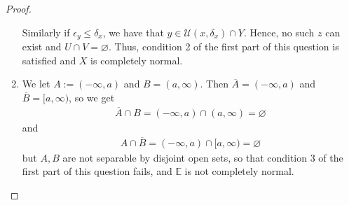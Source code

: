 \documentclass[12pt]{extarticle}
\newcommand{\<}{\langle}
\renewcommand{\>}{\rangle}
\renewcommand{\emptyset}{\varnothing}
\theoremstyle{definition}
\begin{document}
\begin{proof}
\begin{enumerate}
    Similarly if $ \epsilon_y \leq \delta_x$, we have that $y \in \mathcal{U}(x, \delta_x) \cap Y$. Hence, no such $z$ can exist and $U \cap V = \emptyset$. Thus, condition 2 of the first part of this question is satisfied and $X$ is completely normal.
  \item
    We let $A := (- \infty, a)$ and $B = (a, \infty)$. Then $\overline{A} = (- \infty, a) $ and $\overline{B} = [a, \infty)$, so we get 
    \begin{align*}
      \overline{A} \cap B = (- \infty, a) \cap (a, \infty) = \emptyset
    \end{align*}
    and 
    \begin{align*}
      A \cap \overline{B} = (- \infty, a) \cap [a, \infty) = \emptyset
    \end{align*}
    but $A, B$ are not separable by disjoint open sets, so that condition 3 of the first part of this question fails, and $\mathbb{E}$ is not completely normal. 
  \end{enumerate}
  
\end{proof}
\end{document}
